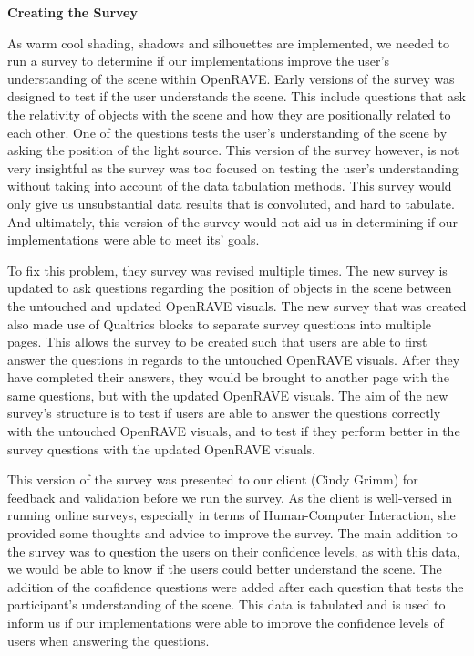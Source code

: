 \documentclass[10pt,journal,compsoc,draftclsnofoot]{IEEEtran}
\begin{document}
\begin{flushleft}
\textbf{Creating the Survey}
\par
As warm cool shading, shadows and silhouettes are implemented, we needed to run a survey to determine if our implementations improve the user's understanding of the scene within OpenRAVE.
Early versions of the survey was designed to test if the user understands the scene.
This include questions that ask the relativity of objects with the scene and how they are positionally related to each other.
One of the questions tests the user's understanding of the scene by asking the position of the light source.
This version of the survey however, is not very insightful as the survey was too focused on testing the user's understanding without taking into account of the data tabulation methods.
This survey would only give us unsubstantial data results that is convoluted, and hard to tabulate.
And ultimately, this version of the survey would not aid us in determining if our implementations were able to meet its' goals.
\vspace{3mm}

To fix this problem, they survey was revised multiple times.
The new survey is updated to ask questions regarding the position of objects in the scene between the untouched and updated OpenRAVE visuals.
The new survey that was created also made use of Qualtrics blocks to separate survey questions into multiple pages.
This allows the survey to be created such that users are able to first answer the questions in regards to the untouched OpenRAVE visuals.
After they have completed their answers, they would be brought to another page with the same questions, but with the updated OpenRAVE visuals.
The aim of the new survey's structure is to test if users are able to answer the questions correctly with the untouched OpenRAVE visuals, and to test if they perform better in the survey questions with the updated OpenRAVE visuals.
\vspace{3mm}

This version of the survey was presented to our client (Cindy Grimm) for feedback and validation before we run the survey.
As the client is well-versed in running online surveys, especially in terms of Human-Computer Interaction, she provided some thoughts and advice to improve the survey.
The main addition to the survey was to question the users on their confidence levels, as with this data, we would be able to know if the users could better understand the scene.
The addition of the confidence questions were added after each question that tests the participant's understanding of the scene.
This data is tabulated and is used to inform us if our implementations were able to improve the confidence levels of users when answering the questions.


\end{flushleft}
\end{document}
